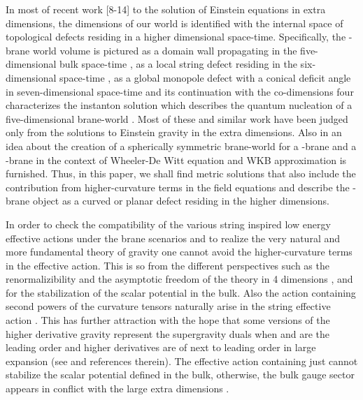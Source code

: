 \documentclass[a4paper,12pt]{article}
\begin{document}
In most of recent work [8-14] to the solution of Einstein equations in 
\coordHE{} extra dimensions, the \coordHE{} dimensions of our world is 
identified with the internal space of topological 
defects residing in a higher dimensional space-time. Specifically, 
the \coordHE{}-brane world volume is pictured as a domain wall propagating in the 
five-dimensional bulk space-time \cite{RS1,ODA}, as a local string defect 
residing in the six-dimensional space-time \cite{TGM,ODA,ACE,AGC}, as a 
global monopole defect with a conical deficit angle in seven-dimensional 
space-time \cite{IAV} and its continuation with the co-dimensions four 
characterizes the instanton solution which describes the quantum nucleation 
of a five-dimensional brane-world \cite{JGM,IAV}. Most of these and similar 
work have been judged only from the solutions to Einstein gravity in the 
extra dimensions. Also in \cite{LCK} an idea about the creation of a 
spherically symmetric brane-world for a \coordHE{}-brane and a \coordHE{}-brane in the 
context of Wheeler-De Witt equation and WKB approximation is furnished. 
Thus, in this paper, we shall find metric solutions that also include 
the contribution from higher-curvature terms in the field equations and 
describe the \coordHE{}-brane object as a curved or planar defect residing in the 
higher dimensions.

In order to check the compatibility of the various string inspired low 
energy effective actions under the brane scenarios and to realize the very 
natural and more fundamental theory of gravity one cannot avoid the 
higher-curvature terms in the effective action. This is so from the 
different perspectives such as the renormalizibility and the asymptotic 
freedom of the theory in 4 dimensions \cite{KKS}, and for the stabilization 
of the scalar potential \cite{CWE} in the bulk. Also the action 
containing second powers of the curvature tensors naturally arise in the 
string effective action \cite{GSW}. This has further attraction with the 
hope that some versions of the higher derivative gravity represent the 
supergravity duals when \coordHE{} and \myHighlight{$\Lambda$}\coordHE{} are the leading order and higher 
derivatives are of next to leading order in large \coordHE{} expansion 
(see \cite{NOJ} and references therein). The effective action containing 
just \coordHE{} cannot stabilize the scalar potential defined in the bulk, 
otherwise, the bulk gauge sector appears in conflict with the large extra 
dimensions \cite{CWE,NAH}.
\end{document}
